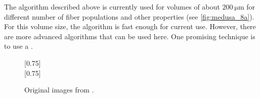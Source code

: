 %
The algorithm described above is currently used for volumes of about $\SI{200}{\micro\meter}$ for different number of fiber populations and other properties (see \cref{fig:medusa_8a}).
For this volume size, the algorithm is fast enough for current use.
However, there are more advanced algorithms that can be used here.
One promising technique is to use a  \cite{Karras2012}.
%
\begin{figure}[!t]
    \centering
    [0.75\textwidth]{\label{fig:medusa_8a}
    }
    \\[2em]
    [0.75\textwidth]{\label{fig:medusa_8b}
    }
	\caption{Original images from \cite{Ginsburger2019}.}
	\label{fig:medusa_8}
\end{figure}
